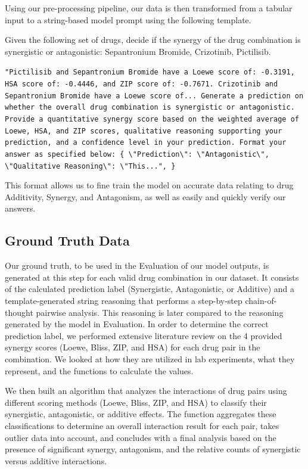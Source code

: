 \documentclass[11pt]{article}
\begin{document}
Using our pre-processing pipeline, our data is then transformed from a tabular input to a string-based model prompt using the following template. 
\begin{tcolorbox}[colback=gray!5!white,colframe=gray!75!black,title=Example Input Prompt,breakable]
\footnotesize
Given the following set of drugs, decide if the synergy of the drug combination is synergistic or antagonistic: Sepantronium Bromide, Crizotinib, Pictilisib.

\texttt{"Pictilisib and Sepantronium Bromide have a Loewe score of: -0.3191, HSA score of: -0.4446, and ZIP score of: -0.7671. Crizotinib and Sepantronium Bromide have a Loewe score of... Generate a prediction on whether the overall drug combination is synergistic or antagonistic. Provide a quantitative synergy score based on the weighted average of Loewe, HSA, and ZIP scores, qualitative reasoning supporting your prediction, and a confidence level in your prediction. Format your answer as specified below:
\{
\textbackslash"Prediction\textbackslash": \textbackslash"Antagonistic\textbackslash",
\textbackslash"Qualitative Reasoning\textbackslash": \textbackslash"This...",
\}
}

\end{tcolorbox}

This format allows us to fine train the model on accurate data relating to drug Additivity, Synergy, and Antagonism, as well as easily and quickly verify our answers.

\subsection{Ground Truth Data}
Our ground truth, to be used in the Evaluation of our model outputs, is generated at this step for each valid drug combination in our dataset. It consists of the calculated prediction label (Synergistic, Antagonistic, or Additive) and a template-generated string reasoning that performs a step-by-step chain-of-thought pairwise analysis. This reasoning is later compared to the reasoning generated by the model in Evaluation. In order to determine the correct prediction label, we performed extensive literature review on the 4 provided synergy scores (Loewe, Bliss, ZIP, and HSA) for each drug pair in the combination. We looked at how they are utilized in lab experiments, what they represent, and the functions to calculate the values.

We then built an algorithm that analyzes the interactions of drug pairs using different scoring methods (Loewe, Bliss, ZIP, and HSA) to classify their synergistic, antagonistic, or additive effects. The function aggregates these classifications to determine an overall interaction result for each pair, takes outlier data into account, and concludes with a final analysis based on the presence of significant synergy, antagonism, and the relative counts of synergistic versus additive interactions.
\end{document}
